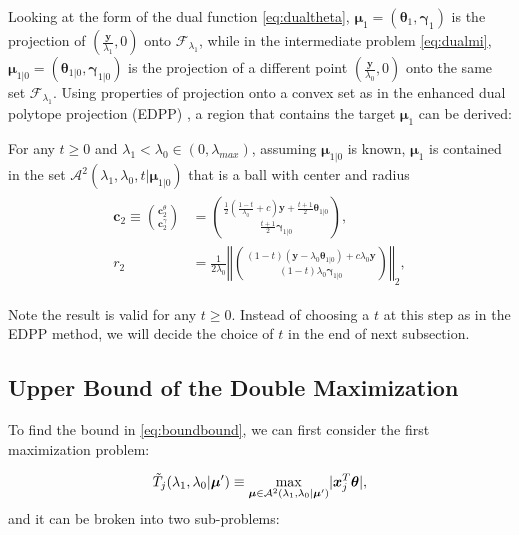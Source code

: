 Looking at the form of the dual function \eqref{eq:dualtheta}, $\boldsymbol\mu_1=(\boldsymbol\theta_1,\boldsymbol\gamma_1)$ is the projection of $(\frac{\boldsymbol y}{\lambda_1},0)$ onto $\mathcal{F}_{\lambda_1}$, while in the intermediate problem \eqref{eq:dualmi}, $\boldsymbol\mu_{1|0}=(\boldsymbol\theta_{1|0},\boldsymbol\gamma_{1|0})$ is the projection of a different point $(\frac{\boldsymbol y}{\lambda_0},0)$ onto the same set $\mathcal{F}_{\lambda_1}$. Using properties of projection onto a convex set as in the enhanced dual polytope projection (EDPP) \citep{wang2013lasso}, a region that contains the target $\boldsymbol\mu_1$ can be derived:

\begin{theorem}
    \label{thm:1.2}
    For any $t\geq0$ and $\lambda_1<\lambda_{0}\in (0,\lambda_{max})$, assuming $\boldsymbol\mu_{1|0}$ is known, $\boldsymbol\mu_1$ is contained in the set $\mathcal{A}^2(\lambda_1,\lambda_0,t|\boldsymbol\mu_{1|0})$ that is a ball with center and radius
    \begin{gather}
        \begin{aligned}
            \boldsymbol c_2\equiv\binom{\boldsymbol c_2^\theta}{\boldsymbol c_2^\gamma}&=\binom{\frac{1}{2}(\frac{1-t}{\lambda_0}+c)\boldsymbol y+\frac{t+1}{2}\boldsymbol\theta_{1|0}}{\frac{t+1}{2}\boldsymbol\gamma_{1|0}},\\
            r_2&=\frac{1}{2\lambda_0}\left\Vert\binom{(1-t)(\boldsymbol y-\lambda_0\boldsymbol\theta_{1|0})+c\lambda_0\boldsymbol y}{(1-t)\lambda_0\boldsymbol\gamma_{1|0}}\right\Vert_2,
        \end{aligned}
    \end{gather}
\end{theorem}
Note the result is valid for any $t\geq 0$. Instead of choosing a $t$ at this step as in the EDPP method, we will decide the choice of $t$ in the end of next subsection.

\subsection{Upper Bound of the Double Maximization}


To find the bound in \eqref{eq:boundbound}, we can first consider the first maximization problem:

\begin{equation}
    \Tilde{T}_j(\lambda_1,\lambda_0|\boldsymbol\mu')\equiv\underset{\boldsymbol\mu\in\mathcal{A}^2(\lambda_1,\lambda_0|\boldsymbol\mu')}{\mathrm{max}}|\boldsymbol x_j^T\boldsymbol\theta|,
\end{equation}
and it can be broken into two sub-problems:

